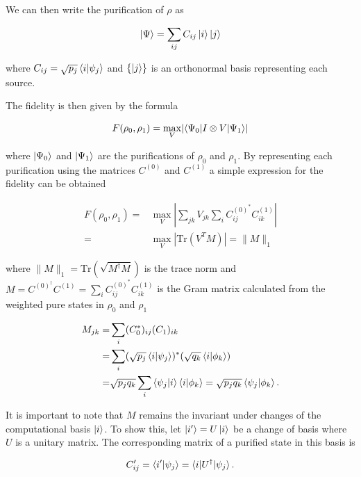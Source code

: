 \documentclass{article}
\DeclarePairedDelimiter\abs{\lvert}{\rvert}%
\begin{document}
We can then write the purification of $\rho$ as

\begin{equation}
\ket{\Psi} = \sum_{ij} C_{ij} \ket{i} \ket{j}
\end{equation}

where $C_{ij} = \sqrt{p_j} \braket{i|\psi_j}$ and $\{\ket{j}\}$ is an orthonormal basis representing each source.

The fidelity is then given by the formula

\begin{equation}
F(\rho_0, \rho_1) = \max_V \abs{\braket{\Psi_0| I \otimes V | \Psi_1}}
\end{equation}

where $\ket{\Psi_0}$ and $\ket{\Psi_1}$ are the purifications of $\rho_0$ and $\rho_1$. By representing each purification using the matrices $C^{(0)}$ and $C^{(1)}$ a simple expression for the fidelity can be obtained

\begin{equation}
\begin{aligned}
F(\rho_0, \rho_1) =& \max_V \left| \sum_{jk} V_{jk} \sum_{i} C^{(0)^*}_{ij} C^{(1)}_{ik} \right| \\
=& \max_V \left| \text{Tr}(V^T M) \right| = \|M\|_1
\end{aligned}
\end{equation}

where $\|M\|_1 = \mathrm{Tr}(\sqrt{M^\dagger M})$ is the trace norm and $M = C^{(0)^\dagger} C^{(1)} = \sum_i C^{(0)^*}_{ij} C^{(1)}_{ik}$ is the Gram matrix calculated from the weighted pure states in $\rho_0$ and $\rho_1$

\begin{equation}
\begin{aligned}
M_{jk} =& \sum_i (C_0^*)_{ij} (C_1)_{ik}\\
= & \sum_{i} (\sqrt{p_j}\braket{i|\psi_j})^*(\sqrt{q_k} \braket{i|\phi_k})\\
= & \sqrt{p_j q_k} \sum_i \braket{\psi_j|i} \braket{i|\phi_k} = \sqrt{p_j q_k} \braket{\psi_j|\phi_k}.
\end{aligned}
\end{equation}

It is important to note that $M$ remains the invariant under changes of the computational basis $\ket{i}$.
To show this, let $\ket{i'} = U\ket{i}$ be a change of basis where $U$ is a unitary matrix. The corresponding matrix of a purified state in this basis is

\begin{equation}
C'_{ij} = \braket{i'|\psi_j} = \braket{i|U^\dagger|\psi_j}.
\end{equation}
\end{document}
